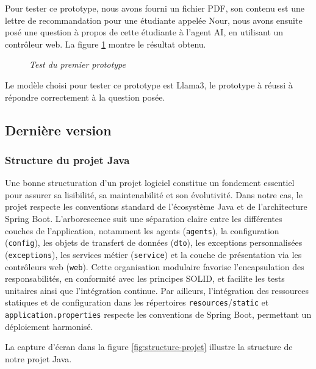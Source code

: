 \documentclass[12pt,a4paper]{report}
\begin{document}
	Pour tester ce prototype, nous avons fourni un fichier PDF, son contenu est une lettre de recommandation pour une étudiante appelée Nour, nous avons ensuite posé une question à propos de cette étudiante à l'agent AI, en utilisant un contrôleur web. La figure \ref{fig:test-rag} montre le résultat obtenu.
	
	\begin{figure}[H]
		\centering
		\caption{\textit{Test du premier prototype}}
		\label{fig:test-rag}
	\end{figure}
	
	Le modèle choisi pour tester ce prototype est Llama3, le prototype à réussi à répondre correctement à la question posée.
	
	\subsection{Dernière version}
	
	\subsubsection{Structure du projet Java}
	
	Une bonne structuration d’un projet logiciel constitue un fondement essentiel pour assurer sa lisibilité, sa maintenabilité et son évolutivité. Dans notre cas, le projet respecte les conventions standard de l’écosystème Java et de l’architecture Spring Boot. L’arborescence suit une séparation claire entre les différentes couches de l’application, notamment les agents (\verb|agents|), la configuration (\verb|config|), les objets de transfert de données (\verb|dto|), les exceptions personnalisées (\verb|exceptions|), les services métier (\verb|service|) et la couche de présentation via les contrôleurs web (\verb|web|). Cette organisation modulaire favorise l'encapsulation des responsabilités, en conformité avec les principes SOLID, et facilite les tests unitaires ainsi que l’intégration continue. Par ailleurs, l’intégration des ressources statiques et de configuration dans les répertoires \verb|resources|/\verb|static| et \verb|application.properties| respecte les conventions de Spring Boot, permettant un déploiement harmonisé.
	
	La capture d'écran dans la figure \ref{fig:structure-projet} illustre la structure de notre projet Java.
	
\end{document}
